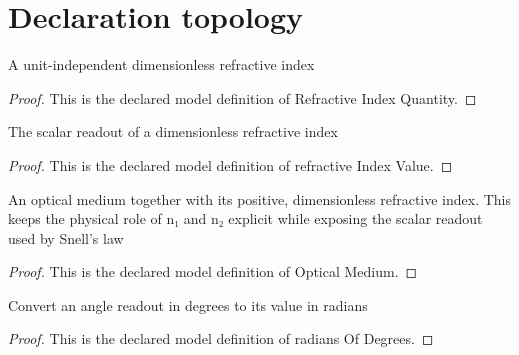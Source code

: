 \section{Declaration topology}
\begin{definition}
  \label{def:physics:phyx-mini-0019:phyxminiproblems-problemphyxmini0019-refractiveindexquantity}
  A unit-independent dimensionless refractive index
\end{definition}
\begin{proof}
  This is the declared model definition of Refractive Index Quantity.
\end{proof}
\begin{definition}
  \label{def:physics:phyx-mini-0019:phyxminiproblems-problemphyxmini0019-refractiveindexvalue}
  The scalar readout of a dimensionless refractive index
\end{definition}
\begin{proof}
  This is the declared model definition of refractive Index Value.
\end{proof}
\begin{definition}
  \label{def:physics:phyx-mini-0019:phyxminiproblems-problemphyxmini0019-opticalmedium}
  An optical medium together with its positive, dimensionless refractive index. This keeps the physical role of n₁ and n₂ explicit while exposing the scalar readout used by Snell's law
\end{definition}
\begin{proof}
  This is the declared model definition of Optical Medium.
\end{proof}
\begin{definition}
  \label{def:physics:phyx-mini-0019:phyxminiproblems-problemphyxmini0019-radiansofdegrees}
  Convert an angle readout in degrees to its value in radians
\end{definition}
\begin{proof}
  This is the declared model definition of radians Of Degrees.
\end{proof}
